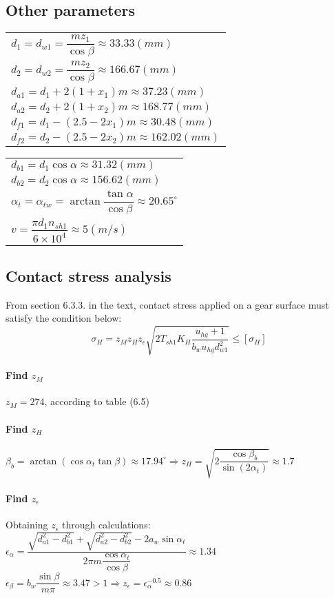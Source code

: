 \subsection{Other parameters}
\begin{tabular}[t]{p{8cm}}
	$ d_1 = d_{w1} = \dfrac{mz_1}{\cos\beta} \approx 33.33\unit{(mm)} $\\
	$ d_2 = d_{w2} = \dfrac{mz_2}{\cos\beta} \approx 166.67 \unit{(mm)} $\\
	$ d_{a1} = d_1 + 2(1+x_1)m \approx 37.23\unit{(mm)}$\\
	$ d_{a2} = d_2 + 2(1+x_2)m \approx 168.77\unit{(mm)}$\\
	$ d_{f1} = d_1 - (2.5-2x_1)m \approx 30.48\unit{(mm)}$\\
	$ d_{f2} = d_2 - (2.5-2x_2)m \approx 162.02\unit{(mm)}$\\
\end{tabular}
\begin{tabular}[t]{p{8cm}}
	$ d_{b1} = d_1\cos\alpha \approx 31.32\unit{(mm)}$\\
	$ d_{b2} = d_2\cos\alpha \approx 156.62 \unit{(mm)}$\\
	$ \alpha_t = \alpha_{tw} = \arctan\dfrac{\tan\alpha}{\cos\beta} \approx 20.65^\circ $\\
	$ v = \dfrac{\pi d_1n_{sh1}}{6\times10^4} \approx 5\unit{(m/s)}$
\end{tabular}

\subsection{Contact stress analysis}
From section 6.3.3. in the text, contact stress applied on a gear surface must satisfy the condition below:
\begin{equation}
	\sigma_H = z_Mz_Hz_\epsilon\sqrt{2T_{sh1}K_H\dfrac{u_{hg}+1}{b_wu_{hg}d_{w1}^2}} \leq [\sigma_H]
\end{equation}

\paragraph{Find $ z_M $}
$ z_M = 274 $, according to table (6.5) 
\paragraph{Find $ z_H $}
$ \beta_b = \arctan\left( \cos\alpha_t\tan\beta\right) \approx 17.94^\circ \Rightarrow z_H = \sqrt{2\dfrac{\cos\beta_b}{\sin(2\alpha_t)}} \approx 1.7$
\paragraph{Find $ z_\epsilon $} Obtaining $ z_\epsilon $ through calculations:\\
$ \epsilon_\alpha = \dfrac{\sqrt{d_{a1}^2-d_{b1}^2}+\sqrt{d_{a2}^2-d_{b2}^2}-2a_w\sin\alpha_{t}}{2\pi m\dfrac{\cos\alpha_t}{\cos\beta}} \approx 1.34$\\
$ \epsilon_\beta = b_w\dfrac{\sin\beta}{m\pi} \approx 3.47>1 \Rightarrow z_\epsilon = \epsilon_\alpha^{-0.5} \approx 0.86 $
